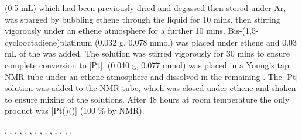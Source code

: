 
 (0.5 mL) which had been previously dried and degassed then stored under Ar, was sparged by bubbling ethene through the liquid for 10 mins, then stirring vigorously under an ethene atmosphere for a further 10 mins.  Bis-(1,5-cyclooctadiene)platinum (0.032 g, 0.078 mmol) was placed under ethene and 0.03 mL of the  was added.  The solution was stirred vigorously for 30 mins to ensure complete conversion to [Pt].  \tButhixantphos(0.040 g, 0.077 mmol) was placed in a Young's tap NMR tube under an ethene atmosphere and dissolved in the remaining .  The [Pt] solution was added to the NMR tube, which was closed under ethene and shaken to ensure mixing of the solutions.  After 48 hours at room temperature the only product was [Pt(\tButhixantphos)()] (100 \% by NMR).  

,
,
,
,
.
,
,
,
,
,
,
,
,
.


